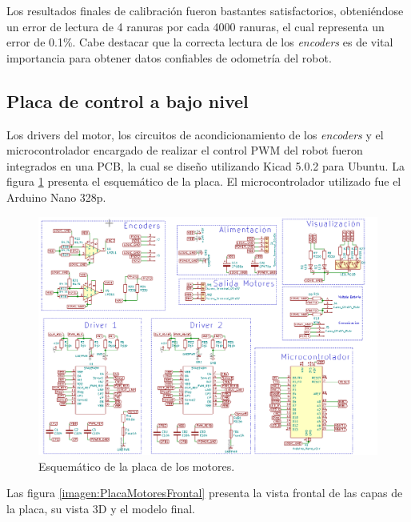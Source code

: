Los resultados finales de calibración fueron bastantes satisfactorios, obteniéndose un error de lectura de 4 ranuras por cada 4000 ranuras, el cual representa un error de 0.1\%.
Cabe destacar que la correcta lectura de los \textit{encoders} es de vital importancia para obtener datos confiables de odometría del robot.

\subsection{Placa de control a bajo nivel}
Los drivers del motor, los circuitos de acondicionamiento de los \textit{encoders} y el microcontrolador encargado de realizar el control PWM del robot fueron integrados en una PCB, la cual se diseño utilizando Kicad 5.0.2 para Ubuntu. La figura \ref{imagen:PlacaMotores} presenta el esquemático de la placa. El microcontrolador utilizado fue el Arduino Nano 328p.


\begin{figure}[H]
	\centering		\includegraphics[width=1.0\linewidth]{imagenes/prototipo/Placa/PlacaMotores}
	\caption[Esquemático de la placa de los motores]{Esquemático de la placa de los motores.}
	\label{imagen:PlacaMotores}
\end{figure}

Las figura \ref{imagen:PlacaMotoresFrontal} presenta la vista frontal de las capas de la placa, su vista 3D y el modelo final.




